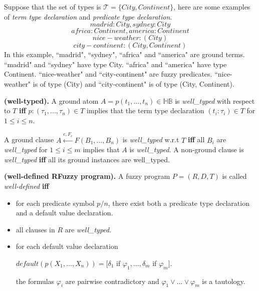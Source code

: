\documentclass[main.tex]{subfiles}
\begin{document}
\begin{ex}
\label{ex:TypeDecl}
Suppose that the set of types is $\mathcal{T}=\{City,Continent\}$, here are some examples of  \textit{term type declaration} and \textit{predicate type declaration}.
\[madrid : City, sydney : City\]
\[africa : Continent, america : Continent\]
\[nice-weather : (City)\]
\[city-continent : (City, Continent)\]
In this example, ``madrid", ``sydney", ``africa" and ``america" are ground terms. ``madrid" and ``sydney" have type City. ``africa" and ``america" have type Continent. ``nice-weather" and ``city-continent" are fuzzy predicates. ``nice-weather" is of type (City) and ``city-continent" is of type (City, Continent).
\end{ex}

\begin{defin}\textbf{(well-typed).}
\label{def:WellTyped}
A ground atom $A=p(t_1,...,t_n)\in\mathbb{HB}$ is \textit{well\_typed} with respect to $T$ \textbf{iff} $p : (\tau_1,...,\tau_n)\in T$ implies that the term type declaration $(t_i : \tau_i)\in T$ for $1 \leq i \leq n$.

A ground clause $A \stackrel{c,F_c}{\leftarrow} F(B_1,...,B_n)$ is \textit{well\_typed} w.r.t $T$ \textbf{iff} all $B_i$ are \textit{well\_typed} for $1 \leq i \leq m$ implies that $A$ is \textit{well\_typed}.
A non-ground clause is \textit{well\_typed} \textbf{iff} all its ground instances are well\_typed. 
\end{defin}

\begin{defin}\textbf{(well-defined RFuzzy program).}
\label{def:WellDefinedProgram}
A fuzzy program $P=(R,D,T)$ is called \textit{well-defined} \textbf{iff}

\begin{itemize}
 
 \item for each predicate symbol $p/n$, there exist both a predicate type declaration and a default value declaration. 
 \item all clauses in $R$ are \textit{well\_typed}.
 \item for each default value declaration 
\begin{center}
 $default(p(X_1,...,X_n))=[\delta_1$ if $\varphi_1,..., \delta_m$ if $\varphi_m]$.
\end{center}
the formulas $\varphi_i$ are pairwise contradictory and $\varphi_1 \vee ... \vee \varphi_m$ is a tautology.
   
\end{itemize}
\end{defin}
\end{document}
